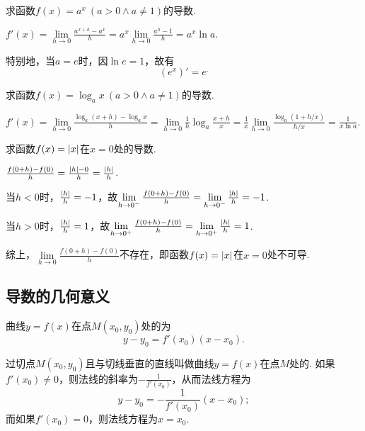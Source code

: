 \begin{example}
求函数\(f(x) = a^x\ (a > 0 \land a \neq 1)\)的导数.
\begin{solution}
\(f'(x)
= \lim\limits_{h\to0}\frac{a^{x+h}-a^x}{h}
= a^x \lim\limits_{h\to0}\frac{a^h-1}{h}
= a^x \ln a.\)
\end{solution}

特别地，当\(a=e\)时，因\(\ln e = 1\)，故有\[
(e^x)' = e^.
\]
\end{example}

\begin{example}
求函数\(f(x) = \log_a x\ (a > 0 \land a \neq 1)\)的导数.
\begin{solution}
\(f'(x)
= \lim\limits_{h\to0}\frac{\log_a(x+h)-\log_a x}{h}
= \lim\limits_{h\to0}{\frac{1}{h} \log_a\frac{x+h}{x}}
= \frac{1}{x} \lim\limits_{h\to0}\frac{\log_a(1+h/x)}{h/x}
= \frac{1}{x \ln a}.\)
\end{solution}
\end{example}

\begin{example}
求函数\(f(x) = \abs{x}\)在\(x=0\)处的导数.
\begin{solution}
\(\frac{f(0+h)-f(0)}{h} = \frac{\abs{h}-0}{h} = \frac{\abs{h}}{h}\).

当\(h < 0\)时，\(\frac{\abs{h}}{h} = -1\)，故\(\lim\limits_{h\to0^-}\frac{f(0+h)-f(0)}{h} = \lim\limits_{h\to0^-}\frac{\abs{h}}{h} = -1\).

当\(h > 0\)时，\(\frac{\abs{h}}{h} = 1\)，故\(\lim\limits_{h\to0^+}\frac{f(0+h)-f(0)}{h} = \lim\limits_{h\to0^+}\frac{\abs{h}}{h} = 1\).

综上，\(\lim\limits_{h\to0}\frac{f(0+h)-f(0)}{h}\)不存在，即函数\(f(x) = \abs{x}\)在\(x = 0\)处不可导.
\end{solution}
\end{example}

\subsection{导数的几何意义}
\begin{theorem}
曲线\(y=f(x)\)在点\(M(x_0,y_0)\)处的为\[
y-y_0=f'(x_0)(x-x_0).
\]

过切点\(M(x_0,y_0)\)且与切线垂直的直线叫做曲线\(y=f(x)\)在点\(M\)处的.
如果\(f'(x_0) \neq 0\)，则法线的斜率为\(-\frac{1}{f'(x_0)}\)，从而法线方程为\[
y-y_0=-\frac{1}{f'(x_0)}(x-x_0);
\]而如果\(f'(x_0) = 0\)，则法线方程为\(x = x_0\).
\end{theorem}

